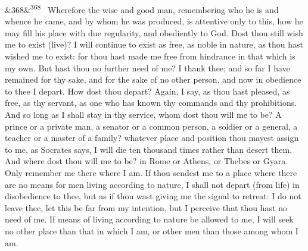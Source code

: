 \documentclass[12pt]{article}
\newcommand{\para}[1][]{\par\noindent\ifx&#1&\else\textsuperscript{\footnotesize #1}~\fi}
\begin{document}
\para[368] Wherefore the wise and good man, remembering who he is and whence he came, and by whom he was produced, is attentive only to this, how he may fill his place with due regularity, and obediently to God. Dost thou still wish me to exist (live)? I will continue to exist as free, as noble in nature, as thou hast wished me to exist: for thou hast made me free from hindrance in that which is my own. But hast thou no further need of me? I thank thee; and so far I have remained for thy sake, and for the sake of no other person, and now in obedience to thee I depart. How dost thou depart? Again, I say, as thou hast pleased, as free, as thy servant, as one who has known thy commands and thy prohibitions. And so long as I shall stay in thy service, whom dost thou will me to be? A prince or a private man, a senator or a common person, a soldier or a general, a teacher or a master of a family? whatever place and position thou mayest assign to me, as Socrates says, I will die ten thousand times rather than desert them. And where dost thou will me to be? in Rome or Athens, or Thebes or Gyara. Only remember me there where I am. If thou sendest me to a place where there are no means for men living according to nature, I shall not depart (from life) in disobedience to thee, but as if thou wast giving me the signal to retreat: I do not leave thee, let this be far from my intention, but I perceive that thou hast no need of me. If means of living according to nature be allowed to me, I will seek no other place than that in which I am, or other men than those among whom I am.
\end{document}
